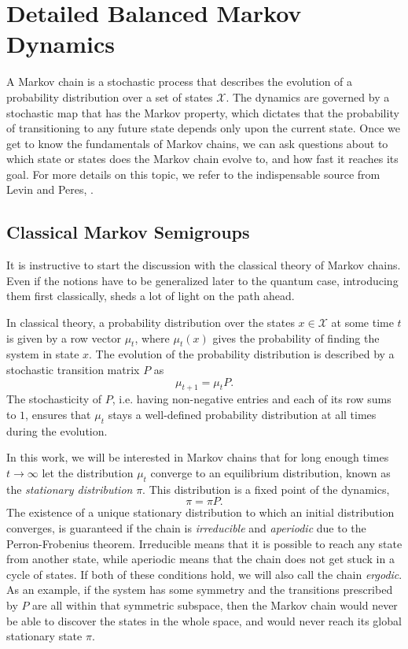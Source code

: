 \chapter{Detailed Balanced Markov Dynamics}
A Markov chain is a stochastic process that describes the evolution of a probability distribution over a set of states $\mathcal{X}$. The dynamics are governed by a stochastic map that has the Markov property, which dictates that the probability of transitioning to any future state depends only upon the current state. Once we get to know the fundamentals of Markov chains, we can ask questions about to which state or states does the Markov chain evolve to, and how fast it reaches its goal. For more details on this topic, we refer to the indispensable source from Levin and Peres, \cite{levin2017markov}.

\section{Classical Markov Semigroups}
It is instructive to start the discussion with the classical theory of Markov chains. Even if the notions have to be generalized later to the quantum case, introducing them first classically, sheds a lot of light on the path ahead.

In classical theory, a probability distribution over the states $x\in\mathcal{X}$ at some time $t$ is given by a row vector $\mu_t$, where $\mu_t(x)$ gives the probability of finding the system in state $x$. The evolution of the probability distribution is described by a stochastic transition matrix $P$ as
$$
\mu_{t+1} = \mu_t P.
$$
The stochasticity of $P$, i.e. having non-negative entries and each of its row sums to $1$, ensures that $\mu_t$ stays a well-defined probability distribution at all times during the evolution.

In this work, we will be interested in Markov chains that for long enough times $t\rightarrow\infty$ let the distribution $\mu_t$ converge to an equilibrium distribution, known as the \textit{stationary distribution} $\pi$. This distribution is a fixed point of the dynamics, 
\begin{equation}
    \pi = \pi P.
\end{equation}
The existence of a unique stationary distribution to which an initial distribution converges, is guaranteed if the chain is \textit{irreducible} and \textit{aperiodic} due to the Perron-Frobenius theorem. Irreducible means that it is possible to reach any state from another state, while aperiodic means that the chain does not get stuck in a cycle of states. If both of these conditions hold, we will also call the chain \textit{ergodic}. As an example, if the system has some symmetry and the transitions prescribed by $P$ are all within that symmetric subspace, then the Markov chain would never be able to discover the states in the whole space, and would never reach its global stationary state $\pi$.

